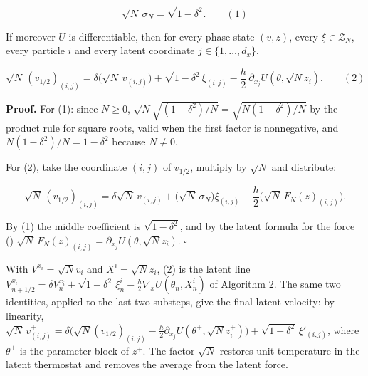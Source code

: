 \documentclass[11pt,a4paper]{article}
\begin{document}
\[\sqrt N\,\sigma_N=\sqrt{1-\delta^2}.\qquad(1)\]


If moreover \(U\) is differentiable, then for every phase state \((v,z)\), every \(\xi\in\mathcal Z_N\), every particle \(i\) and every latent coordinate \(j\in\{1,\dots,d_x\}\),


\[\sqrt N\,(v_{1/2})_{(i,j)}=\delta\bigl(\sqrt N\,v_{(i,j)}\bigr)+\sqrt{1-\delta^2}\,\xi_{(i,j)}-\frac h2\,\partial_{x_j}U(\theta,\sqrt Nz_i).\qquad(2)\]


\textbf{Proof.} For (1): since \(N\ge0\), \(\sqrt N\sqrt{(1-\delta^2)/N}=\sqrt{N(1-\delta^2)/N}\) by the product rule for square roots, valid when the first factor is nonnegative, and \(N(1-\delta^2)/N=1-\delta^2\) because \(N\ne0\).




For (2), take the coordinate \((i,j)\) of \(v_{1/2}\), multiply by \(\sqrt N\) and distribute:


\[\sqrt N\,(v_{1/2})_{(i,j)}=\delta\sqrt N\,v_{(i,j)}+\bigl(\sqrt N\,\sigma_N\bigr)\xi_{(i,j)}-\frac h2\bigl(\sqrt N\,F_N(z)_{(i,j)}\bigr).\]


By (1) the middle coefficient is \(\sqrt{1-\delta^2}\), and by the latent formula for the force (\cite[Section~3.1.4]{LangevinLean2026KIPLMC}) \(\sqrt N\,F_N(z)_{(i,j)}=\partial_{x_j}U(\theta,\sqrt Nz_i)\). \(\square\)




With \(V^{x_i}=\sqrt Nv_i\) and \(X^i=\sqrt Nz_i\), (2) is the latent line \(V^{x_i}_{n+1/2}=\delta V^{x_i}_n+\sqrt{1-\delta^2}\,\xi^i_n-\frac h2\nabla_xU(\theta_n,X^i_n)\) of Algorithm 2. The same two identities, applied to the last two substeps, give the final latent velocity: by linearity, \(\sqrt N\,v^+_{(i,j)}=\delta\bigl(\sqrt N(v_{1/2})_{(i,j)}-\frac h2\partial_{x_j}U(\theta^+,\sqrt Nz^+_i)\bigr)+\sqrt{1-\delta^2}\,\xi'_{(i,j)}\), where \(\theta^+\) is the parameter block of \(z^+\). The factor \(\sqrt N\) restores unit temperature in the latent thermostat and removes the average from the latent force.
\end{document}

